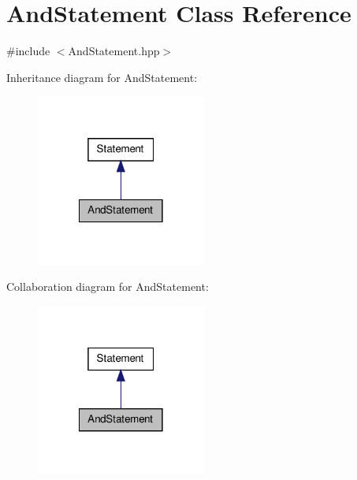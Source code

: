 \hypertarget{class_and_statement}{\section{And\-Statement Class Reference}
\label{class_and_statement}
}


{\ttfamily \#include $<$And\-Statement.\-hpp$>$}



Inheritance diagram for And\-Statement\-:
\nopagebreak
\begin{figure}[H]
\begin{center}
\leavevmode
\includegraphics[width=158pt]{class_and_statement__inherit__graph}
\end{center}
\end{figure}


Collaboration diagram for And\-Statement\-:
\nopagebreak
\begin{figure}[H]
\begin{center}
\leavevmode
\includegraphics[width=158pt]{class_and_statement__coll__graph}
\end{center}
\end{figure}
